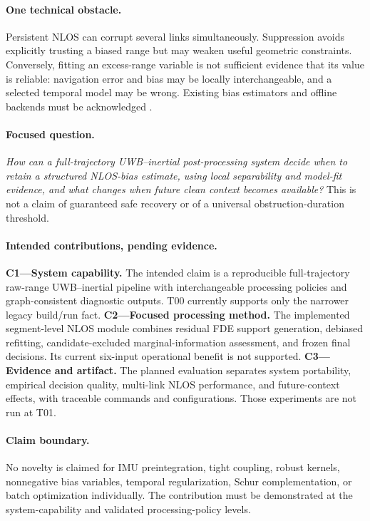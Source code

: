 \documentclass[conference]{IEEEtran}%
\begin{document}
\paragraph{One technical obstacle.}
Persistent NLOS can corrupt several links simultaneously. Suppression avoids explicitly trusting a biased range but may weaken useful geometric constraints. Conversely, fitting an excess-range variable is not sufficient evidence that its value is reliable: navigation error and bias may be locally interchangeable, and a selected temporal model may be wrong. Existing bias estimators and offline backends must be acknowledged \cite{tan2026,yu2026,lu2026}.

\paragraph{Focused question.}
\emph{How can a full-trajectory UWB--inertial post-processing system decide when to retain a structured NLOS-bias estimate, using local separability and model-fit evidence, and what changes when future clean context becomes available?}
This is not a claim of guaranteed safe recovery or of a universal obstruction-duration threshold.

\paragraph{Intended contributions, pending evidence.}
\textbf{C1---System capability.} The intended claim is a reproducible full-trajectory raw-range UWB--inertial pipeline with interchangeable processing policies and graph-consistent diagnostic outputs. T00 currently supports only the narrower legacy build/run fact.
\textbf{C2---Focused processing method.} The implemented segment-level NLOS module combines residual FDE support generation, debiased refitting, candidate-excluded marginal-information assessment, and frozen final decisions. Its current six-input operational benefit is not supported.
\textbf{C3---Evidence and artifact.} The planned evaluation separates system portability, empirical decision quality, multi-link NLOS performance, and future-context effects, with traceable commands and configurations. Those experiments are not run at T01.

\paragraph{Claim boundary.}
No novelty is claimed for IMU preintegration, tight coupling, robust kernels, nonnegative bias variables, temporal regularization, Schur complementation, or batch optimization individually. The contribution must be demonstrated at the system-capability and validated processing-policy levels.
\end{document}
